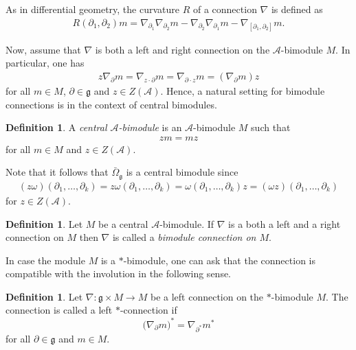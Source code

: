\documentclass{amsart}
\newcommand{\paraa}[1]{\big(#1\big)}
\theoremstyle{definition}
\newtheorem{definition}[theorem]{Definition}
\theoremstyle{remark}
\numberwithin{equation}{section}
\newcommand{\A}{\mathcal{A}}
\renewcommand{\d}{\partial}
\newcommand{\g}{\mathfrak{g}}
\newcommand{\Omegabg}[1]{\bar{\Omega}^{#1}_{\g}}
\renewcommand{\emph}[1]{\textit{#1}}
\begin{document}
\noindent
As in differential geometry, the curvature $R$ of a
connection $\nabla$ is defined as
\begin{align*}
  R(\d_1,\d_2)m = \nabla_{\d_1}\nabla_{\d_2}m-\nabla_{\d_2}\nabla_{\d_1}m
  -\nabla_{[\d_1,\d_2]}m.
\end{align*}



\noindent
Now, assume that $\nabla$ is both a left and right connection on the
$\A$-bimodule $M$. In particular, one has
\begin{align*}
  z\nabla_{\d}m = \nabla_{z\cdot \d}m = \nabla_{\d\cdot z}m = (\nabla_{\d}m)z
\end{align*}
for all $m\in M$, $\d\in\g$ and $z\in Z(\A)$. Hence, a natural setting
for bimodule connections is in the context of central bimodules.

\begin{definition}
  A \emph{central $\A$-bimodule} is an $\A$-bimodule $M$ such that
  \begin{align*}
    zm = mz
  \end{align*}
  for all $m\in M$ and $z\in Z(\A)$.
\end{definition}

\noindent
Note that it follows that $\Omegabg{}$ is a central bimodule since
\begin{align*}
  (z\omega)(\d_1,\ldots,\d_k)
  = z\omega(\d_1,\ldots,\d_k)
  = \omega(\d_1,\ldots,\d_k)z
  = (\omega z)(\d_1,\ldots,\d_k)
\end{align*}
for $z\in Z(\A)$.

\begin{definition}
  Let $M$ be a central $\A$-bimodule. If $\nabla$ is a both a left and
  a right connection on $M$ then $\nabla$ is called a \emph{bimodule
    connection on $M$}.
\end{definition}

\noindent
In case the module $M$ is a $\ast$-bimodule, one can ask that the
connection is compatible with the involution in the following sense.

\begin{definition}
  Let $\nabla:\g\times M\to M$ be a left connection on the
  $\ast$-bimodule $M$. The connection is called a left
  $\ast$-connection if
  \begin{equation*}
    \paraa{\nabla_\d m}^\ast = \nabla_{\d^\ast}m^\ast
  \end{equation*}
  for all $\d\in\g$ and $m\in M$.
\end{definition}
\end{document}
